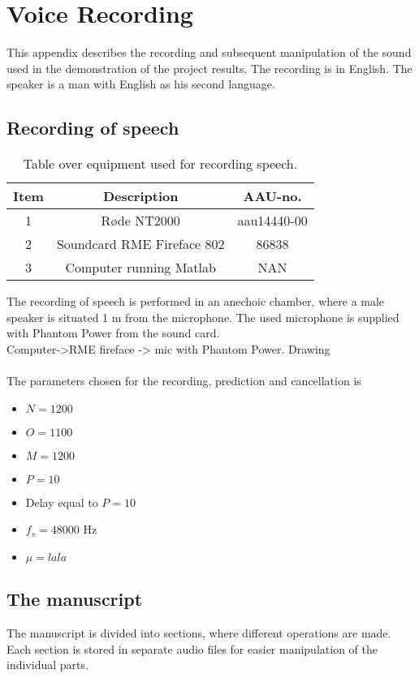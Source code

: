 \section{Voice Recording}
This appendix describes the recording and subsequent manipulation of the sound used in the demonstration of the project results. The recording is in English. The speaker is a man with English as his second language. 

\subsection{Recording of speech}
\begin{table}[H]
	\centering
	\begin{tabular}{ c c c } \toprule
		{Item}	& {Description} 						& {AAU-no}. \\ \bottomrule 
		1	& Røde NT2000 	& aau14440-00	\\
		2	& Soundcard RME Fireface 802	& 86838 		\\
		3	& Computer running Matlab	 & 	NAN	\\
		\bottomrule
	\end{tabular}
	\caption{Table over equipment used for recording speech.}
	\label{tab:VoiceRec}
\end{table}
The recording of speech is performed in an anechoic chamber, where a male speaker is situated 1 m from the microphone. The used microphone is supplied with Phantom Power from the sound card. \\ 
Computer->RME fireface -> mic with Phantom Power. Drawing\\\\

The parameters chosen for the recording, prediction and cancellation is
\begin{itemize}
	\item $N=1200$
	\item $O=1100$
	\item $M=1200$
	\item $P=10$
	\item Delay equal to $P=10$
	\item $f_s =48000$ Hz
	\item $\mu= lala$
\end{itemize}


\subsection{The manuscript}
The manuscript is divided into sections, where different operations are made. Each section is stored in separate audio files for easier manipulation of the individual parts. 
 
